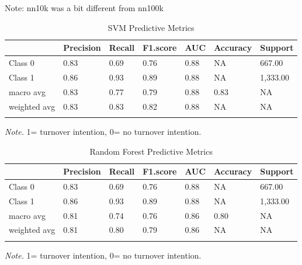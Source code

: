 \documentclass[
  man]{apa7}
\begin{document}
Note: nn10k was a bit different from nn100k

\begin{table}[tbp]

\begin{center}
\begin{threeparttable}

\caption{\label{tab:svm10k}SVM Predictive Metrics}

\begin{tabular}{lllllll}
\toprule
 & \multicolumn{1}{c}{Precision} & \multicolumn{1}{c}{Recall} & \multicolumn{1}{c}{F1.score} & \multicolumn{1}{c}{AUC} & \multicolumn{1}{c}{Accuracy} & \multicolumn{1}{c}{Support}\\
\midrule
Class 0 & 0.83 & 0.69 & 0.76 & 0.88 & NA & 667.00\\
Class 1 & 0.86 & 0.93 & 0.89 & 0.88 & NA & 1,333.00\\
macro avg & 0.83 & 0.77 & 0.79 & 0.88 & 0.83 & NA\\
weighted avg & 0.83 & 0.83 & 0.82 & 0.88 & NA & NA\\
\bottomrule
\addlinespace
\end{tabular}

\begin{tablenotes}[para]
\normalsize{\textit{Note.} 1= turnover intention, 0= no turnover intention.}
\end{tablenotes}

\end{threeparttable}
\end{center}

\end{table}

\begin{table}[tbp]

\begin{center}
\begin{threeparttable}

\caption{\label{tab:rf10k}Random Forest Predictive Metrics}

\begin{tabular}{lllllll}
\toprule
 & \multicolumn{1}{c}{Precision} & \multicolumn{1}{c}{Recall} & \multicolumn{1}{c}{F1.score} & \multicolumn{1}{c}{AUC} & \multicolumn{1}{c}{Accuracy} & \multicolumn{1}{c}{Support}\\
\midrule
Class 0 & 0.83 & 0.69 & 0.76 & 0.88 & NA & 667.00\\
Class 1 & 0.86 & 0.93 & 0.89 & 0.88 & NA & 1,333.00\\
macro avg & 0.81 & 0.74 & 0.76 & 0.86 & 0.80 & NA\\
weighted avg & 0.81 & 0.80 & 0.79 & 0.86 & NA & NA\\
\bottomrule
\addlinespace
\end{tabular}

\begin{tablenotes}[para]
\normalsize{\textit{Note.} 1= turnover intention, 0= no turnover intention.}
\end{tablenotes}

\end{threeparttable}
\end{center}

\end{table}
\end{document}
